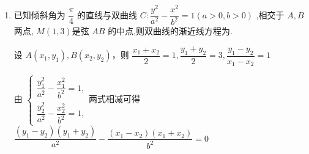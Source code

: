 \begin{enumerate}
\begin{enumerate}
\begin{jieda}
\begin{enumerate}
                两式相减可得 $\dfrac{{x}_{1}^{2} - {x}_{2}^{2}}{4} - \dfrac{{y}_{1}^{2} - {y}_{2}^{2}}{12} = 0$ ,
                整理得 $\dfrac{{y}_{1}^{2} - {y}_{2}^{2}}{{x}_{1}^{2} - {x}_{2}^{2}} = \dfrac{\left( {{y}_{1} + {y}_{2}}\right) \left( {{y}_{1} - {y}_{2}}\right) }{\left( {{x}_{1} + {x}_{2}}\right) \left( {{x}_{1} - {x}_{2}}\right) } = \dfrac{{18}\left( {{y}_{1} - {y}_{2}}\right) }{4\left( {{x}_{1} - {x}_{2}}\right) } = \dfrac{9\left( {{y}_{1} - {y}_{2}}\right) }{2\left( {{x}_{1} - {x}_{2}}\right) } = 3$ ,
                可得 $\dfrac{{y}_{1} - {y}_{2}}{{x}_{1} - {x}_{2}} = \dfrac{2}{3}$ ,即直线 ${AB}$ 的斜率 ${k}_{AB} = \dfrac{2}{3}$ ,
                所以直线 ${AB}$ 的方程 $y - 9 = \dfrac{2}{3}\left( {x - 2}\right)$ ,即 ${2x} - {3y} + {23} = 0$ ,
                联立方程 $\left\{  \begin{array}{l} \dfrac{{x}^{2}}{4} - \dfrac{{y}^{2}}{12} = 1 \\  {2x} - {3y} + {23} = 0 \end{array}\right.$ ,消去 $x$ 得 $\dfrac{23}{3}{y}^{2} - {138y} + {513} = 0$ ,
                可得 $\Delta  = {\left( -{138}\right) }^{2} - 4 \times  \dfrac{23}{3} \times  {513} = {3312} > 0$ ,
                即直线 ${AB}$ 与双曲线相交,直线 ${2x} - {3y} + {23} = 0$ 符合题意,
                综上所述: 直线 ${AB}$ 的方程为 ${2x} - {3y} + {23} = 0$ .
            \end{enumerate}
        \end{jieda}

        \item 已知倾斜角为 $\dfrac{\pi }{4}$ 的直线与双曲线 $C : \dfrac{{y}^{2}}{{a}^{2}} - \dfrac{{x}^{2}}{{b}^{2}} = 1\left( {a > 0,b > 0}\right)$ ,相交于 $A,B$ 两点, $M\left( {1,3}\right)$是弦 ${AB}$ 的中点,则双曲线的渐近线方程为.
        \begin{jieda}
            设 $A\left( {{x}_{1},{y}_{1}}\right) ,B\left( {{x}_{2},{y}_{2}}\right)$，则 $\dfrac{{x}_{1} + {x}_{2}}{2} = 1,\dfrac{{y}_{1} + {y}_{2}}{2} = 3,\dfrac{{y}_{1} - {y}_{2}}{{x}_{1} - {x}_{2}} = 1$ 
            
            由 $\left\{  \begin{array}{l} \dfrac{{y}_{1}^{2}}{{a}^{2}} - \dfrac{{x}_{1}^{2}}{{b}^{2}} = 1, \\  \dfrac{{y}_{2}^{2}}{{a}^{2}} - \dfrac{{x}_{2}^{2}}{{b}^{2}} = 1, \end{array}\right.$两式相减可得 $\dfrac{\left( {{y}_{1} - {y}_{2}}\right) \left( {{y}_{1} + {y}_{2}}\right) }{{a}^{2}} - \dfrac{\left( {{x}_{1} - {x}_{2}}\right) \left( {{x}_{1} + {x}_{2}}\right) }{{b}^{2}} = 0$
            

\end{jieda}
\end{enumerate}
\end{enumerate}
